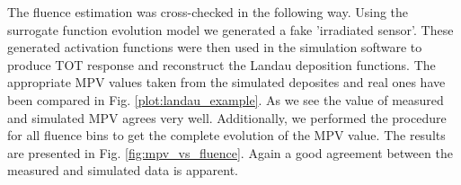The fluence estimation was cross-checked in the following way. Using the surrogate function evolution model we generated a fake 'irradiated sensor'. These generated activation functions were then used in the simulation software to produce TOT response and reconstruct the Landau deposition functions. The appropriate MPV values taken from the simulated deposites and real ones have been compared in Fig. \ref{plot:landau_example}. As we see the value of measured and simulated MPV agrees very well.
Additionally, we performed the procedure for all fluence bins to get the complete evolution of the MPV value.
The results are presented in Fig. \ref{fig:mpv_vs_fluence}. Again a good agreement between the measured and simulated data is apparent.


